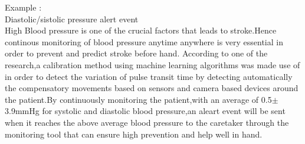 Example :\\ Diastolic/sistolic pressure alert event\\
High Blood pressure is one of the crucial factors that leads to stroke.Hence continous monitoring of blood pressure anytime anywhere is very essential in order to prevent and predict stroke before hand.\cite{ma2014blood} According to one of the research,a calibration method using machine learning algorithms was made use of in order to detect the variation of pulse transit time by detecting automatically the compensatory movements based on sensors and camera based devices around the patient.By continuously monitoring the patient,with an average of 0.5$\pm$3.9mmHg for systolic and diastolic blood pressure\cite{ma2014blood},an aleart event will be sent when it reaches the above average blood pressure to the caretaker through the monitoring tool that can ensure high prevention and help well in hand.
